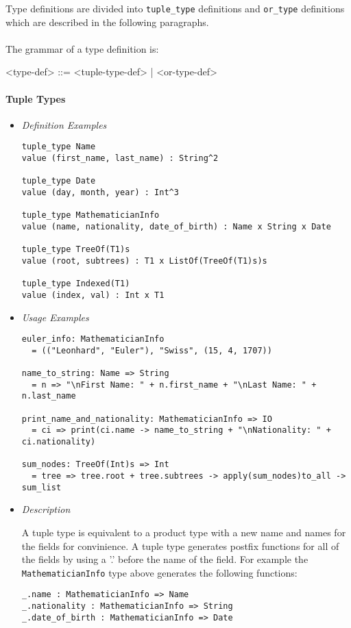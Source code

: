 \documentclass{article}
\begin{document}
Type definitions are divided into \texttt{tuple_type} definitions and
\texttt{or_type} definitions which are described in the following paragraphs.
\\\\
The grammar of a type definition is:
\begin{grammar}
<type-def> ::= <tuple-type-def> | <or-type-def>
\end{grammar}

\paragraph{Tuple Types}

\begin{itemize}
\item \textit{Definition Examples}

\begin{verbatim}
tuple_type Name
value (first_name, last_name) : String^2

tuple_type Date
value (day, month, year) : Int^3

tuple_type MathematicianInfo
value (name, nationality, date_of_birth) : Name x String x Date

tuple_type TreeOf(T1)s
value (root, subtrees) : T1 x ListOf(TreeOf(T1)s)s

tuple_type Indexed(T1)
value (index, val) : Int x T1
\end{verbatim}

\item \textit{Usage Examples}

\begin{verbatim}
euler_info: MathematicianInfo
  = (("Leonhard", "Euler"), "Swiss", (15, 4, 1707))

name_to_string: Name => String
  = n => "\nFirst Name: " + n.first_name + "\nLast Name: " + n.last_name

print_name_and_nationality: MathematicianInfo => IO
  = ci => print(ci.name -> name_to_string + "\nNationality: " + ci.nationality)

sum_nodes: TreeOf(Int)s => Int
  = tree => tree.root + tree.subtrees -> apply(sum_nodes)to_all -> sum_list
\end{verbatim}

\item \textit{Description}

A tuple type is equivalent to a product type with a new name  and names for the
fields for convinience. A tuple type generates postfix functions for all of
the fields by using a '.' before the name of the field. For example the
\texttt{MathematicianInfo} type above generates the following functions:
\begin{verbatim}
_.name : MathematicianInfo => Name
_.nationality : MathematicianInfo => String
_.date_of_birth : MathematicianInfo => Date
\end{verbatim}


\end{itemize}
\end{document}
